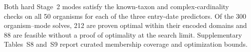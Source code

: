 Both hard Stage~2 modes satisfy the known-taxon and complex-cardinality checks on all 50 organisms for each of the three entry-date predictors. Of the 300 organism--mode solves, 212 are proven optimal within their encoded domains and 88 are feasible without a proof of optimality at the search limit. Supplementary Tables~S8 and~S9 report curated membership coverage and optimization bounds.
